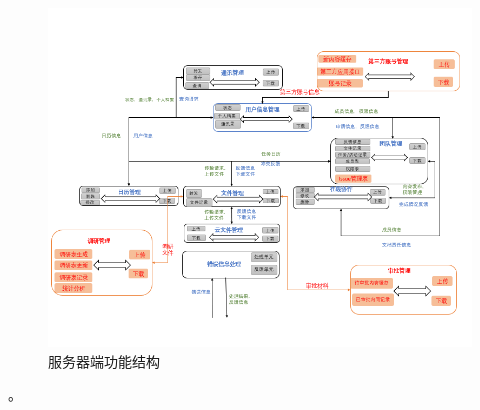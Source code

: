         \newpage
        \begin{figure}[h]
            \centering
            \includegraphics[scale=1]{OutlineDesign/figures/服务器端功能结构.png}
            \caption{\color{red}服务器端功能结构}
            \label{fig:server_flow}
        \end{figure}。
    
